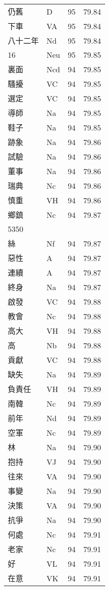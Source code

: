 \documentclass[twocolumn]{book}
\begin{document}
\begin{supertabular}{llrr}
仍舊 & D & 95 &  79.84\\
下車 & VA & 95 &  79.84\\
八十二年 & Nd & 95 &  79.84\\
16 & Neu & 95 &  79.85\\
裏面 & Ncd & 94 &  79.85\\
騷擾 & VC & 94 &  79.85\\
選定 & VC & 94 &  79.85\\
導師 & Na & 94 &  79.85\\
鞋子 & Na & 94 &  79.85\\
跡象 & Na & 94 &  79.86\\
試驗 & Na & 94 &  79.86\\
董事 & Na & 94 &  79.86\\
瑞典 & Nc & 94 &  79.86\\
慎重 & VH & 94 &  79.86\\
鄉鎮 & Nc & 94 &  79.87\\
5350\\
絲 & Nf & 94 &  79.87\\
惡性 & A & 94 &  79.87\\
連續 & A & 94 &  79.87\\
終身 & Na & 94 &  79.87\\
啟發 & VC & 94 &  79.88\\
教會 & Nc & 94 &  79.88\\
高大 & VH & 94 &  79.88\\
高 & Nb & 94 &  79.88\\
貢獻 & VC & 94 &  79.88\\
缺失 & Na & 94 &  79.89\\
負責任 & VH & 94 &  79.89\\
南韓 & Nc & 94 &  79.89\\
前年 & Nd & 94 &  79.89\\
空軍 & Nc & 94 &  79.89\\
林 & Na & 94 &  79.90\\
抱持 & VJ & 94 &  79.90\\
往來 & VA & 94 &  79.90\\
事變 & Na & 94 &  79.90\\
決策 & VA & 94 &  79.90\\
抗爭 & Na & 94 &  79.90\\
何處 & Nc & 94 &  79.91\\
老家 & Nc & 94 &  79.91\\
好 & VL & 94 &  79.91\\
在意 & VK & 94 &  79.91\\

\end{supertabular}
\end{document}
